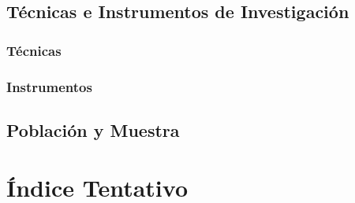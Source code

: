 \documentclass{univalle-perfil}
\begin{document}

\subsection{Técnicas e Instrumentos de Investigación}

\subsubsection{Técnicas}


\subsubsection{Instrumentos}


\subsection{Población y Muestra}


\section{Índice Tentativo}
\end{document}
